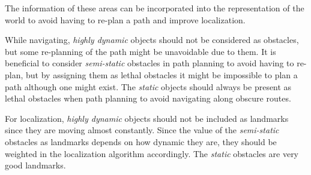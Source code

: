 The information of these areas can be incorporated into the representation of the world to avoid having to re-plan a path and improve localization. 

While navigating, \textit{highly dynamic} objects should not be considered as obstacles, but some re-planning of the path might be unavoidable due to them. 
It is beneficial to consider \textit{semi-static} obstacles in path planning to avoid having to re-plan, but by assigning them as lethal obstacles it might be impossible to plan a path although one might exist.
The \textit{static} objects should always be present as lethal obstacles when path planning to avoid navigating along obscure routes.

For localization, \textit{highly dynamic} objects should not be included as landmarks since they are moving almost constantly. 
Since the value of the \textit{semi-static} obstacles as landmarks depends on how dynamic they are, they should be weighted in the localization algorithm accordingly. 
The \textit{static} obstacles are very good landmarks.